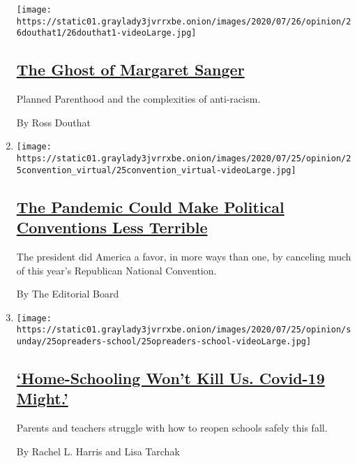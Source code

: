 \begin{enumerate}
  \texttt{[image: https://static01.graylady3jvrrxbe.onion/images/2020/07/26/opinion/26douthat1/26douthat1-videoLarge.jpg]}

  \hypertarget{the-ghost-of-margaret-sanger}{%
  \subsection{\texorpdfstring{\href{/2020/07/25/opinion/sunday/abortion-racism-margaret-sanger.html}{The
  Ghost of Margaret
  Sanger}}{The Ghost of Margaret Sanger}}\label{the-ghost-of-margaret-sanger}}

  Planned Parenthood and the complexities of anti-racism.

  By Ross Douthat
\item
  \texttt{[image: https://static01.graylady3jvrrxbe.onion/images/2020/07/25/opinion/25convention\_virtual/25convention\_virtual-videoLarge.jpg]}

  \hypertarget{the-pandemic-could-make-political-conventions-less-terrible}{%
  \subsection{\texorpdfstring{\href{/2020/07/25/opinion/sunday/republican-convention-trump.html}{The
  Pandemic Could Make Political Conventions Less
  Terrible}}{The Pandemic Could Make Political Conventions Less Terrible}}\label{the-pandemic-could-make-political-conventions-less-terrible}}

  The president did America a favor, in more ways than one, by canceling
  much of this year's Republican National Convention.

  By The Editorial Board
\item
  \texttt{[image: https://static01.graylady3jvrrxbe.onion/images/2020/07/25/opinion/sunday/25opreaders-school/25opreaders-school-videoLarge.jpg]}

  \hypertarget{home-schooling-wont-kill-us-covid-19-might}{%
  \subsection{\texorpdfstring{\href{/2020/07/25/opinion/coronavirus-school-reopening.html}{`Home-Schooling
  Won't Kill Us. Covid-19
  Might.'}}{`Home-Schooling Won't Kill Us. Covid-19 Might.'}}\label{home-schooling-wont-kill-us-covid-19-might}}

  Parents and teachers struggle with how to reopen schools safely this
  fall.

  By Rachel L. Harris and Lisa Tarchak
\end{enumerate}

